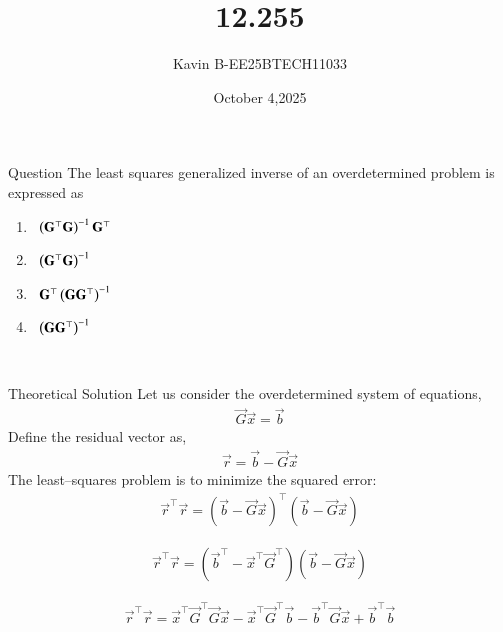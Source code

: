 \documentclass{beamer}
\begin{document}
\title 
{12.255}
\date{October 4,2025}


\author 
{Kavin B-EE25BTECH11033}






\frame{\titlepage}
\begin{frame}{Question}
The least squares generalized inverse of an overdetermined problem is expressed as  


\begin{enumerate}
	\item \ $\left(\mathbf{G}^\top \mathbf{G}\right)^{-1} \mathbf{G}^\top$  
	\item \ $\left(\mathbf{G}^\top \mathbf{G}\right)^{-1}$  
	\item \ $\mathbf{G}^\top \left(\mathbf{G} \mathbf{G}^\top\right)^{-1} $ 
	\item \ $\left(\mathbf{G} \mathbf{G}^\top\right)^{-1}$  
\end{enumerate}\\  
\bigskip

\end{frame}



\begin{frame}{Theoretical Solution}
Let us consider the overdetermined system of equations,
\begin{align}
\vec{G}\vec{x} = \vec{b}
\end{align}
Define the residual vector as,
\begin{align}
\vec{r} = \vec{b} - \vec{G}\vec{x}
\end{align}
The least--squares problem is to minimize the squared error:
\begin{align}
\vec{r}^{\top} \vec{r} = (\vec{b} - \vec{G}\vec{x})^{\top}(\vec{b} - \vec{G}\vec{x})
\end{align}

\begin{align}
\vec{r}^{\top} \vec{r}= (\vec{b} ^{\top} - \vec{x}^{\top}\vec{G}^{\top})(\vec{b} - \vec{G}\vec{x})
\end{align}

\begin{align}
\vec{r}^{\top} \vec{r}= \vec{x}^{\top}\vec{G}^{\top}\vec{G}\vec{x} - \vec{x}^{\top}\vec{G}^{\top}\vec{b} - \vec{b} ^{\top}\vec{G}\vec{x} + \vec{b} ^{\top}\vec{b} 
\end{align}
\end{frame}
\end{document}

